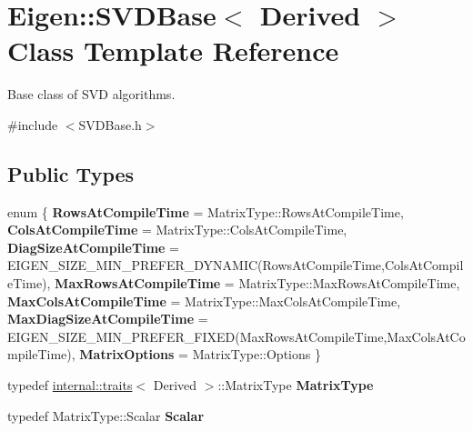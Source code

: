 \hypertarget{class_eigen_1_1_s_v_d_base}{}\section{Eigen\+::S\+V\+D\+Base$<$ Derived $>$ Class Template Reference}
\label{class_eigen_1_1_s_v_d_base}


Base class of S\+VD algorithms.  




{\ttfamily \#include $<$S\+V\+D\+Base.\+h$>$}

\subsection*{Public Types}
\begin{DoxyCompactItemize}
\item 
\mbox{\label{class_eigen_1_1_s_v_d_base_af129512e3a155d8b32a0c2faee6f894c}} 
enum \{ \newline
{\bfseries Rows\+At\+Compile\+Time} = Matrix\+Type\+::Rows\+At\+Compile\+Time, 
{\bfseries Cols\+At\+Compile\+Time} = Matrix\+Type\+::Cols\+At\+Compile\+Time, 
{\bfseries Diag\+Size\+At\+Compile\+Time} = E\+I\+G\+E\+N\+\_\+\+S\+I\+Z\+E\+\_\+\+M\+I\+N\+\_\+\+P\+R\+E\+F\+E\+R\+\_\+\+D\+Y\+N\+A\+M\+IC(Rows\+At\+Compile\+Time,Cols\+At\+Compile\+Time), 
{\bfseries Max\+Rows\+At\+Compile\+Time} = Matrix\+Type\+::Max\+Rows\+At\+Compile\+Time, 
\newline
{\bfseries Max\+Cols\+At\+Compile\+Time} = Matrix\+Type\+::Max\+Cols\+At\+Compile\+Time, 
{\bfseries Max\+Diag\+Size\+At\+Compile\+Time} = E\+I\+G\+E\+N\+\_\+\+S\+I\+Z\+E\+\_\+\+M\+I\+N\+\_\+\+P\+R\+E\+F\+E\+R\+\_\+\+F\+I\+X\+ED(Max\+Rows\+At\+Compile\+Time,Max\+Cols\+At\+Compile\+Time), 
{\bfseries Matrix\+Options} = Matrix\+Type\+::Options
 \}
\item 
\mbox{\label{class_eigen_1_1_s_v_d_base_aee6fbe51774ff57b8446f0b14a4f34ac}} 
typedef \mbox{\hyperlink{struct_eigen_1_1internal_1_1traits}{internal\+::traits}}$<$ Derived $>$\+::Matrix\+Type {\bfseries Matrix\+Type}
\item 
\mbox{\label{class_eigen_1_1_s_v_d_base_a9ac59dd357f42051be947ca7c4a23745}} 
typedef Matrix\+Type\+::\+Scalar {\bfseries Scalar}
\item 

\end{DoxyCompactItemize}
